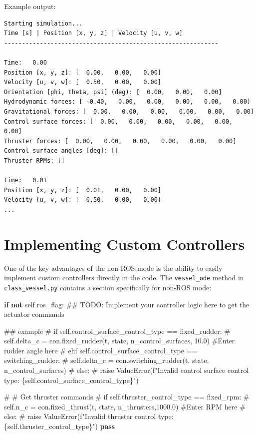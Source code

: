 \documentclass[
  letterpaper,
  DIV=11,
  numbers=noendperiod]{scrreprt}
\newenvironment{Shaded}{\begin{snugshade}}{\end{snugshade}}
\newcommand{\AlertTok}[1]{\textcolor[rgb]{0.68,0.00,0.00}{#1}}
\newcommand{\CommentTok}[1]{\textcolor[rgb]{0.37,0.37,0.37}{#1}}
\newcommand{\ControlFlowTok}[1]{\textcolor[rgb]{0.00,0.23,0.31}{\textbf{#1}}}
\newcommand{\KeywordTok}[1]{\textcolor[rgb]{0.00,0.23,0.31}{\textbf{#1}}}
\newcommand{\NormalTok}[1]{\textcolor[rgb]{0.00,0.23,0.31}{#1}}
\newcommand{\VariableTok}[1]{\textcolor[rgb]{0.07,0.07,0.07}{#1}}
\begin{document}
Example output:

\begin{verbatim}
Starting simulation...
Time [s] | Position [x, y, z] | Velocity [u, v, w]
------------------------------------------------------------

Time:   0.00
Position [x, y, z]: [  0.00,   0.00,   0.00]
Velocity [u, v, w]: [  0.50,   0.00,   0.00]
Orientation [phi, theta, psi] (deg): [  0.00,   0.00,   0.00]
Hydrodynamic forces: [ -0.40,   0.00,   0.00,   0.00,   0.00,   0.00]
Gravitational forces: [  0.00,   0.00,   0.00,   0.00,   0.00,   0.00]
Control surface forces: [  0.00,   0.00,   0.00,   0.00,   0.00,   0.00]
Thruster forces: [  0.00,   0.00,   0.00,   0.00,   0.00,   0.00]
Control surface angles [deg]: []
Thruster RPMs: []

Time:   0.01
Position [x, y, z]: [  0.01,   0.00,   0.00]
Velocity [u, v, w]: [  0.50,   0.00,   0.00]
...
\end{verbatim}

\section*{Implementing Custom
Controllers}\label{implementing-custom-controllers}


One of the key advantages of the non-ROS mode is the ability to easily
implement custom controllers directly in the code. The
\texttt{vessel\_ode} method in \texttt{class\_vessel.py} contains a
section specifically for non-ROS mode:

\begin{Shaded}
\begin{Highlighting}[]
\ControlFlowTok{if} \KeywordTok{not} \VariableTok{self}\NormalTok{.ros\_flag:}
    \CommentTok{\#\# }\AlertTok{TODO}\CommentTok{: Implement your controller logic here to get the actuator commands}
    
    \CommentTok{\#\# example}
    \CommentTok{\# if self.control\_surface\_control\_type == \textquotesingle{}fixed\_rudder\textquotesingle{}:}
    \CommentTok{\#     self.delta\_c = con.fixed\_rudder(t, state, n\_control\_surfaces, 10.0) \#Enter rudder angle here}
    \CommentTok{\# elif self.control\_surface\_control\_type == \textquotesingle{}switching\_rudder\textquotesingle{}:}
    \CommentTok{\#     self.delta\_c = con.switching\_rudder(t, state, n\_control\_surfaces)}
    \CommentTok{\# else:}
    \CommentTok{\#     raise ValueError(f"Invalid control surface control type: \{self.control\_surface\_control\_type\}")}
        
    \CommentTok{\# \# Get thruster commands}
    \CommentTok{\# if self.thruster\_control\_type == \textquotesingle{}fixed\_rpm\textquotesingle{}:}
    \CommentTok{\#     self.n\_c = con.fixed\_thrust(t, state, n\_thrusters,1000.0) \#Enter RPM here}
    \CommentTok{\# else:}
    \CommentTok{\#     raise ValueError(f"Invalid thruster control type: \{self.thruster\_control\_type\}")}
    \ControlFlowTok{pass}
\end{Highlighting}
\end{Shaded}
\end{document}
